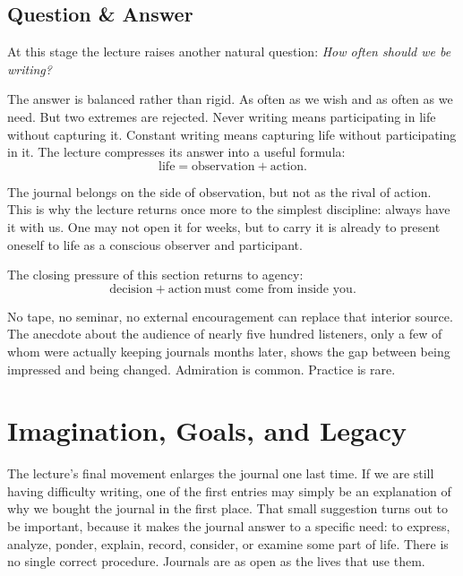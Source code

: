 \subsection{Question \& Answer}

At this stage the lecture raises another natural question: \emph{How often should we be writing?}

The answer is balanced rather than rigid. As often as we wish and as often as we need. But two extremes are rejected. Never writing means participating in life without capturing it. Constant writing means capturing life without participating in it. The lecture compresses its answer into a useful formula:
\begin{equation}
\text{life}=\text{observation}+\text{action}.
\end{equation}

The journal belongs on the side of observation, but not as the rival of action. This is why the lecture returns once more to the simplest discipline: always have it with us. One may not open it for weeks, but to carry it is already to present oneself to life as a conscious observer and participant.

The closing pressure of this section returns to agency:
\begin{equation}
\text{decision}+\text{action}\ \text{must come from inside you}.
\end{equation}

No tape, no seminar, no external encouragement can replace that interior source. The anecdote about the audience of nearly five hundred listeners, only a few of whom were actually keeping journals months later, shows the gap between being impressed and being changed. Admiration is common. Practice is rare.

\section{Imagination, Goals, and Legacy}

The lecture's final movement enlarges the journal one last time. If we are still having difficulty writing, one of the first entries may simply be an explanation of why we bought the journal in the first place. That small suggestion turns out to be important, because it makes the journal answer to a specific need: to express, analyze, ponder, explain, record, consider, or examine some part of life. There is no single correct procedure. Journals are as open as the lives that use them.

